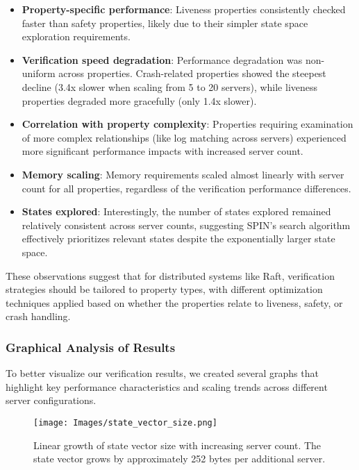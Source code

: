 \begin{itemize}
    \item \textbf{Property-specific performance}: Liveness properties consistently checked faster than safety properties, likely due to their simpler state space exploration requirements.
    
    \item \textbf{Verification speed degradation}: Performance degradation was non-uniform across properties. Crash-related properties showed the steepest decline (3.4x slower when scaling from 5 to 20 servers), while liveness properties degraded more gracefully (only 1.4x slower).
    
    \item \textbf{Correlation with property complexity}: Properties requiring examination of more complex relationships (like log matching across servers) experienced more significant performance impacts with increased server count.
    
    \item \textbf{Memory scaling}: Memory requirements scaled almost linearly with server count for all properties, regardless of the verification performance differences.
    
    \item \textbf{States explored}: Interestingly, the number of states explored remained relatively consistent across server counts, suggesting SPIN's search algorithm effectively prioritizes relevant states despite the exponentially larger state space.
\end{itemize}

These observations suggest that for distributed systems like Raft, verification strategies should be tailored to property types, with different optimization techniques applied based on whether the properties relate to liveness, safety, or crash handling.

\subsubsection{Graphical Analysis of Results}
\label{sec:graphical_analysis}

To better visualize our verification results, we created several graphs that highlight key performance characteristics and scaling trends across different server configurations.

\begin{figure}[htbp]
    \centering
    \texttt{[image: Images/state\_vector\_size.png]}
    \caption{Linear growth of state vector size with increasing server count. The state vector grows by approximately 252 bytes per additional server.}
    \label{fig:state-vector}
\end{figure}

